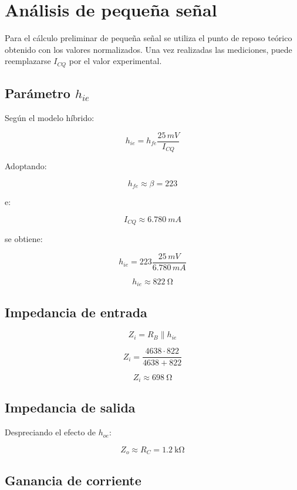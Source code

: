 \documentclass[a4paper,12pt]{article}
\begin{document}
\section{Análisis de pequeña señal}

Para el cálculo preliminar de pequeña señal se utiliza el punto de reposo teórico obtenido con los
valores normalizados. Una vez realizadas las mediciones, puede reemplazarse $I_{CQ}$ por el valor
experimental.

\subsection{Parámetro $h_{ie}$}

Según el modelo híbrido:

\[
h_{ie}
=
h_{fe}\frac{25\,mV}{I_{CQ}}
\]

Adoptando:

\[
h_{fe}\approx\beta=223
\]

e:

\[
I_{CQ}\approx\SI{6.780}{mA}
\]

se obtiene:

\[
h_{ie}
=
223
\frac{25\,mV}{6.780\,mA}
\]

\[
\boxed{h_{ie}\approx\SI{822}{\ohm}}
\]

\subsection{Impedancia de entrada}

\[
Z_i
=
R_B\parallel h_{ie}
\]

\[
Z_i
=
\frac{4638\cdot822}{4638+822}
\]

\[
\boxed{Z_i\approx\SI{698}{\ohm}}
\]

\subsection{Impedancia de salida}

Despreciando el efecto de $h_{oe}$:

\[
\boxed{Z_o\approx R_C=\SI{1.2}{\kilo\ohm}}
\]

\subsection{Ganancia de corriente}
\end{document}
